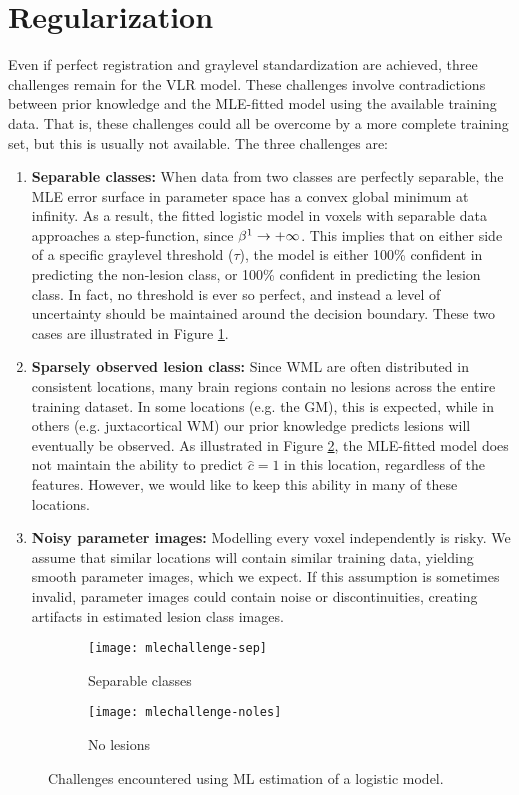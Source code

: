 \section{Regularization}
Even if perfect registration and graylevel standardization are achieved, three challenges remain for the VLR model. These challenges involve contradictions between prior knowledge and the MLE-fitted model using the available training data. That is, these challenges could all be overcome by a more complete training set, but this is usually not available. The three challenges are:
\begin{enumerate}
  \item \label{mlech:separable} \textbf{Separable classes:} 
  When data from two classes are perfectly separable, the MLE error surface in parameter space has a convex global minimum at infinity. As a result, the fitted logistic model in voxels with separable data approaches a step-function, since $\beta^1\rightarrow+\infty$. This implies that on either side of a specific graylevel threshold ($\tau$), the model is either 100\% confident in predicting the non-lesion class, or 100\% confident in predicting the lesion class. In fact, no threshold is ever so perfect, and instead a level of uncertainty should be maintained around the decision boundary. These two cases are illustrated in Figure \ref{fig:mlech-sep}.
  \item \label{mlech:sparse} \textbf{Sparsely observed lesion class:} 
  Since WML are often distributed in consistent locations, many brain regions contain no lesions across the entire training dataset. In some locations (e.g. the GM), this is expected, while in others (e.g. juxtacortical WM) our prior knowledge predicts lesions will eventually be observed. As illustrated in Figure \ref{fig:mlech-noles}, the MLE-fitted model does not maintain the ability to predict $\hat{c} = 1$ in this location, regardless of the features. However, we would like to keep this ability in many of these locations. 
  \item \label{mlech:noisy} \textbf{Noisy parameter images:} 
  Modelling every voxel independently is risky. We assume that similar locations will contain similar training data, yielding smooth parameter images, which we expect. If this assumption is sometimes invalid, parameter images could contain noise or discontinuities, creating artifacts in estimated lesion class images.
\end{enumerate}
\begin{figure}
  \centering
  \begin{subfigure}{\plotwidth}
    \texttt{[image: mlechallenge-sep]}\caption{Separable classes}\label{fig:mlech-sep}
  \end{subfigure}
  \begin{subfigure}{\plotwidth}
    \texttt{[image: mlechallenge-noles]}\caption{No lesions}\label{fig:mlech-noles}
  \end{subfigure}
  \caption{Challenges encountered using ML estimation of a logistic model.}
  \label{fig:mlech}
\end{figure}
